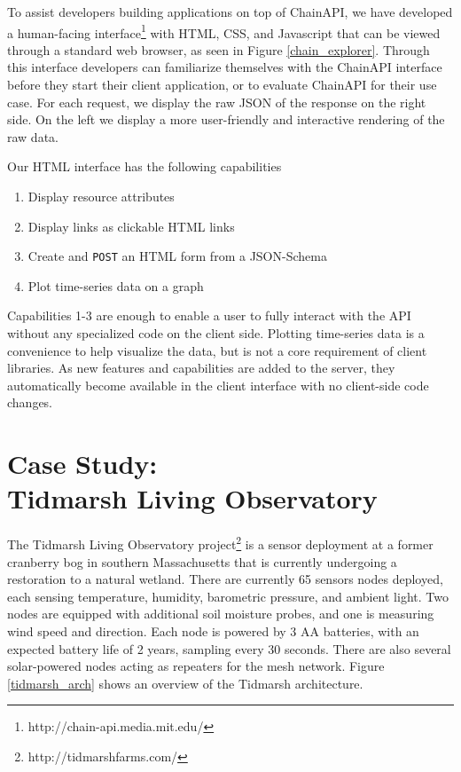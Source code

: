 \documentclass{acm_proc_article-sp}
\newenvironment{tightenumerate}{
    \vspace{-10pt}
    \begin{enumerate}
        \setlength{\parskip}{-1pt}}{
    \end{enumerate}
    \vspace{-10pt}}
\begin{document}
To assist developers building applications on top of ChainAPI, we have
developed a human-facing interface\footnote{http://chain-api.media.mit.edu/}
with HTML, CSS, and Javascript that can be viewed through a standard web
browser, as seen in Figure \ref{chain_explorer}.  Through this interface
developers can familiarize themselves with the ChainAPI interface before they
start their client application, or to evaluate ChainAPI for their use case.
For each request, we display the raw JSON of the response on the right side. On
the left we display a more user-friendly and interactive rendering of the raw
data.

Our HTML interface has the following capabilities

\begin{tightenumerate}
    \item Display resource attributes
    \item Display links as clickable HTML links
    \item Create and \texttt{POST} an HTML form from a JSON-Schema
    \item Plot time-series data on a graph
\end{tightenumerate}

Capabilities 1-3 are enough to enable a user to fully interact with the API
without any specialized code on the client side. Plotting time-series data is a
convenience to help visualize the data, but is not a core requirement of client
libraries. As new features and capabilities are added to the server, they
automatically become available in the client interface with no client-side code
changes.

\section{Case Study:\\Tidmarsh Living Observatory}

The Tidmarsh Living Observatory project\footnote{http://tidmarshfarms.com/} is
a sensor deployment at a former cranberry bog in southern Massachusetts that is
currently undergoing a restoration to a natural wetland. There are currently 65
sensors nodes deployed, each sensing temperature, humidity, barometric
pressure, and ambient light. Two nodes are equipped with additional soil
moisture probes, and one is measuring wind speed and direction. Each node is
powered by 3 AA batteries, with an expected battery life of 2 years, sampling
every 30 seconds. There are also several solar-powered nodes acting as
repeaters for the mesh network. Figure \ref{tidmarsh_arch} shows an overview of
the Tidmarsh architecture.
\end{document}
